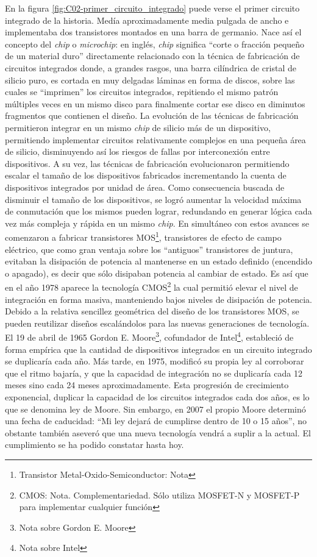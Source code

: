 En la figura \ref{fig:C02-primer_circuito_integrado} puede verse el primer circuito integrado de la historia. Medía aproximadamente media pulgada de ancho e implementaba dos transistores montados en una barra de germanio. Nace así el concepto del \emph{chip} o \emph{microchip}: en inglés, \emph{chip} significa ``corte o fracción pequeño de un material duro'' directamente relacionado con la técnica de fabricación de circuitos integrados donde, a grandes rasgos, una barra cilíndrica de cristal de silicio puro, es cortada en muy delgadas láminas en forma de discos, sobre las cuales se ``imprimen'' los circuitos integrados, repitiendo el mismo patrón múltiples veces en un mismo disco para finalmente cortar ese disco en diminutos fragmentos que contienen el diseño. La evolución de las técnicas de fabricación permitieron integrar en un mismo \emph{chip} de silicio más de un dispositivo, permitiendo implementar circuitos relativamente complejos en una pequeña área de silicio, disminuyendo así los riesgos de fallas por interconexión entre dispositivos. A su vez, las técnicas de fabricación evolucionaron permitiendo escalar el tamaño de los dispositivos fabricados incrementando la cuenta de dispositivos integrados por unidad de área. Como consecuencia buscada de disminuir el tamaño de los dispositivos, se logró aumentar la velocidad máxima de conmutación que los mismos pueden lograr, redundando en generar lógica cada vez más compleja y rápida en un mismo \emph{chip}. En simultáneo con estos avances se comenzaron a fabricar transistores MOS\footnote{Transistor Metal-Oxido-Semiconductor: Nota}, transistores de efecto de campo eléctrico, que como gran ventaja sobre los ``antiguos'' transistores de juntura, evitaban la disipación de potencia al mantenerse en un estado definido (encendido o apagado), es decir que sólo disipaban potencia al cambiar de estado. Es así que en el año 1978 aparece la tecnología CMOS\footnote{CMOS: Nota. Complementariedad. Sólo utiliza MOSFET-N y MOSFET-P para implementar cualquier función} la cual permitió elevar el nivel de integración en forma masiva, manteniendo bajos niveles de disipación de potencia. Debido a la relativa sencillez geométrica del diseño de los transistores MOS, se pueden reutilizar diseños escalándolos para las nuevas generaciones de tecnología. El 19 de abril de 1965 Gordon E. Moore\footnote{Nota sobre Gordon E. Moore}, cofundador de Intel\footnote{Nota sobre Intel}, estableció de forma empírica que la cantidad de dispositivos integrados en un circuito integrado se duplicaría cada año. Más tarde, en 1975, modificó su propia ley al corroborar que el ritmo bajaría, y que la capacidad de integración no se duplicaría cada 12 meses sino cada 24 meses aproximadamente. Esta progresión de crecimiento exponencial, duplicar la capacidad de los circuitos integrados cada dos años, es lo que se denomina ley de Moore. Sin embargo, en 2007 el propio Moore determinó una fecha de caducidad: ``Mi ley dejará de cumplirse dentro de 10 o 15 años'', no obstante también aseveró que una nueva tecnología vendrá a suplir a la actual. El cumplimiento se ha podido constatar hasta hoy.


